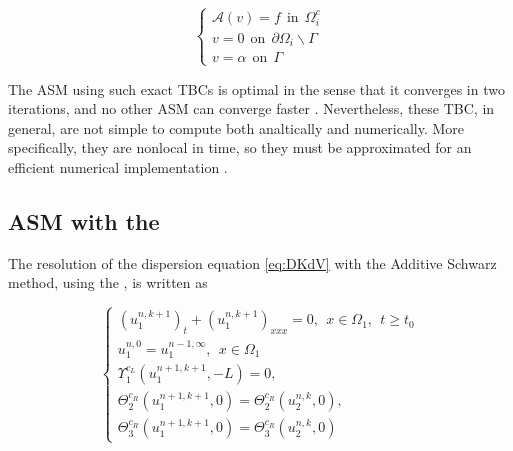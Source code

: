 \begin{equation*}
\begin{cases}
\mathcal{A}(v) = f \ \ \text{in} \ \ \Omega_i^c\\
v = 0 \ \ \text{on} \ \ \partial \Omega_i \backslash \Gamma \\
v = \alpha \ \ \text{on} \ \ \Gamma
\end{cases}
\end{equation*}

\indent The ASM using such exact TBCs is optimal in the sense that it converges in two iterations, and no other ASM can converge faster \cite{Japhet2003}. Nevertheless, these TBC, in general, are not simple to compute both analtically and numerically. More specifically, they are nonlocal in time, so they must be approximated for an efficient numerical implementation \cite{Xavieretal2008}. 

\subsection{ASM with the }

\indent The resolution of the dispersion equation \eqref{eq:DKdV} with the Additive Schwarz method, using the  , is written as

\begin{equation}
    \label{eq:problemDDM1}
    \begin{cases}
        (u_1^{n,k+1})_t + (u_1^{n,k+1})_{xxx} = 0 , \ \ x \in \Omega_1, \ \ t \geq t_0\\
        u_1^{n,0} = u_1^{n-1,\infty} , \ \ x \in \Omega_1 \\
        \Upsilon_1^{c_L}(u_1^{n+1,k+1},-L) = 0, \\ 
        \Theta_2^{c_R}(u_1^{n+1,k+1},0) = \Theta_2^{c_R}(u_2^{n,k},0) , \\
        \Theta_3^{c_R}(u_1^{n+1,k+1},0) = \Theta_3^{c_R}(u_2^{n,k},0)
     \end{cases}
\end{equation}

